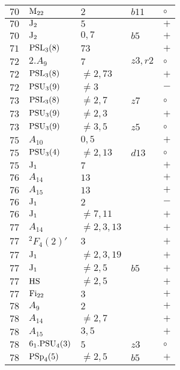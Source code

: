 \documentclass[a4paper, 11pt]{article}
\begin{document}
\begin{longtable}{lllll}
		$70$ & ${\rm M}_{22}$ & $2$ & $b11$ & $\circ$ \\ \hline
		$70$ & ${\rm J}_2$ & $5$ &  & $+$ \\ \hline
		$70$ & ${\rm J}_2$ & $0,7$ & $b5$ & $+$ \\ \hline
		$71$ & ${\rm PSL}_{3}(8)$ & $73$ &  & $+$ \\ \hline
		$72$ & $2.A_{9}$ & $7$ & $z3, r2$ & $\circ$ \\ \hline
		$72$ & ${\rm PSL}_{3}(8)$ & $\neq 2,73$ &  & $+$ \\ \hline
		$72$ & ${\rm PSU}_{3}(9)$ & $\neq 3$ &  & $-$ \\ \hline
		$73$ & ${\rm PSL}_{3}(8)$ & $\neq 2,7$ & $z7$ & $\circ$ \\ \hline
		$73$ & ${\rm PSU}_{3}(9)$ & $\neq 2,3$ &  & $+$ \\ \hline
		$73$ & ${\rm PSU}_{3}(9)$ & $\neq 3,5$ & $z5$ & $\circ$ \\ \hline
		$75$ & $A_{10}$ & $0,5$ &  & $+$ \\ \hline
		$75$ & ${\rm PSU}_{3}(4)$ & $\neq 2,13$ & $d13$ & $\circ$ \\ \hline
		$75$ & ${\rm J}_1$ & $7$ &  & $+$ \\ \hline
		$76$ & $A_{14}$ & $13$ &  & $+$ \\ \hline
		$76$ & $A_{15}$ & $13$ &  & $+$ \\ \hline
		$76$ & ${\rm J}_1$ & $2$ &  & $-$ \\ \hline
		$76$ & ${\rm J}_1$ & $\neq 7,11$ &  & $+$ \\ \hline
		$77$ & $A_{14}$ & $\neq 2,3,13$ &  & $+$ \\ \hline
		$77$ & ${}^{2}F_{4}(2)'$ & $3$ &  & $+$ \\ \hline
		$77$ & ${\rm J}_1$ & $\neq 2,3,19$ &  & $+$ \\ \hline
		$77$ & ${\rm J}_1$ & $\neq 2,5$ & $b5$ & $+$ \\ \hline
		$77$ & ${\rm HS}$ & $\neq 2,5$ &  & $+$ \\ \hline
		$77$ & ${\rm Fi}_{22}$ & $3$ &  & $+$ \\ \hline
		$78$ & $A_{9}$ & $2$ &  & $+$ \\ \hline
		$78$ & $A_{14}$ & $\neq 2,7$ &  & $+$ \\ \hline
		$78$ & $A_{15}$ & $3,5$ &  & $+$ \\ \hline
		$78$ & $6_1.{\rm PSU}_{4}(3)$ & $5$ & $z3$ & $\circ$ \\ \hline
		$78$ & ${\rm PSp}_{4}(5)$ & $\neq 2,5$ & $b5$ & $+$ \\ \hline

\end{longtable}
\end{document}
